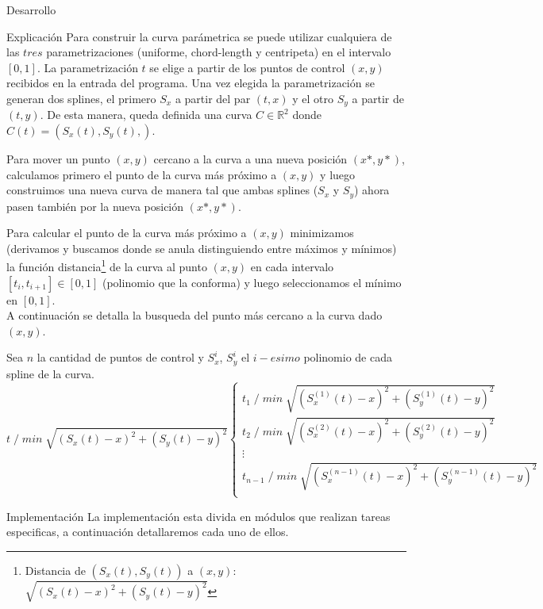 \begin{section}{Desarrollo}
	\begin{subsection}{Explicación}
		Para construir la curva parámetrica se puede utilizar cualquiera de las $tres$ parametrizaciones (uniforme, chord-length y centripeta) en el intervalo
		$[0,1]$.
		La parametrización $t$ se elige a partir de los puntos de control $(x,y)$ recibidos en la entrada del programa.
		Una vez elegida la parametrización se generan dos splines, el primero $S_x$ a partir del par $(t,x)$ y el otro $S_y$ a partir de $(t,y)$.
		De esta manera, queda definida una curva $C \in \mathbb{R}^2$ donde $C(t) = (S_x(t),S_y(t),)$.
		
		Para mover un punto $(x,y)$ cercano a la curva a una nueva posición $(x*,y*)$, calculamos primero el punto de la curva más próximo a $(x,y)$ y luego
		construimos una nueva curva de manera tal que ambas splines ($S_x$ y $S_y$) ahora pasen también por la nueva posición $(x*,y*)$.
		
		Para calcular el punto de la curva más próximo a $(x,y)$ minimizamos (derivamos y buscamos donde se anula distinguiendo entre máximos y mínimos) la 
		función distancia\footnote{Distancia de $(S_x(t),S_y(t))$ a $(x,y)$: $\sqrt{(S_x(t)-x)^2+(S_y(t)-y)^2}$} de la curva al punto $(x,y)$ en cada intervalo
		$[t_i,t_{i+1}] \in [0,1]$ (polinomio que la conforma) y luego seleccionamos el mínimo en $[0,1]$.\\
		
		A continuación se detalla la busqueda del punto más cercano a la curva dado $(x,y)$.
		
		Sea $n$ la cantidad de puntos de control y $S_x^i$, $S_y^i$ el $i-esimo$ polinomio de cada spline de la curva.\\
		
		 
		$t \; /\; min\; \sqrt{(S_x(t)-x)^2+(S_y(t)-y)^2} \left\{
		\begin{array}{c}
		t_1\; /\; min\; \sqrt{(S_x^{(1)}(t)-x)^2+(S_y^{(1)}(t)-y)^2}\\
		t_2\; /\; min\; \sqrt{(S_x^{(2)}(t)-x)^2+(S_y^{(2)}(t)-y)^2}\\
		\vdots\\
		t_{n-1}\; /\; min\; \sqrt{(S_x^{(n-1)}(t)-x)^2+(S_y^{(n-1)}(t)-y)^2}\\
		\end{array}
		\right.$
		\VSP
		
	\end{subsection}
	\begin{subsection}{Implementación}
		La implementación esta divida en módulos que realizan tareas especificas, a continuación detallaremos cada uno de ellos.
		

\end{subsection}
\end{section}
